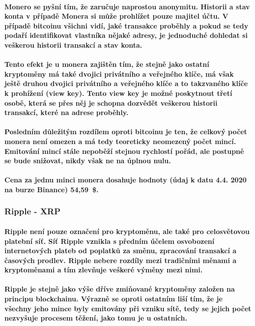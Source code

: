 \documentclass[thesis=B,czech]{FITthesis}[2019/03/21]
\begin{document}
\paragraph{
Monero se pyšní tím, že zaručuje naprostou anonymitu. Historii a stav konta v případě Monera si může prohlížet pouze majitel účtu. V případě bitcoinu všichni vidí, jaké transakce proběhly a pokud se tedy podaří identifikovat vlastníka nějaké adresy, je jednoduché dohledat si veškerou historii transakcí a stav konta.
}
\paragraph{
Tento efekt je u monera zajištěn tím, že stejně jako ostatní kryptoměny má také dvojici privátního a veřejného klíče, má však ještě druhou dvojici privátního a veřejného klíče a to takzvaného klíče k prohížení (view key). Tento view key je možné poskytnout třetí osobě, která se přes něj je schopna dozvědět veškerou historii transakcí, které na adrese proběhly.
}
\paragraph{
Posledním důležitým rozdílem oproti bitcoinu je ten, že celkový počet monera není omezen a má tedy teoreticky neomezený počet mincí. Emitování mincí stále nepoběží stejnou rychlostí pořád, ale postupně se bude snižovat, nikdy však ne na úplnou nulu. \cite{alza_monero}
}
\paragraph{
Cena za jednu minci monera dosahuje hodnoty (údaj k datu 4.4. 2020 na burze Binance) 54,59~\$. \cite{binance_markets}
}
\subsubsection{Ripple - XRP}
\paragraph{
Ripple není pouze označení pro kryptoměnu, ale také pro celosvětovou platební síť. Síť Ripple vznikla s předním účelem osvobození internetových plateb od poplatků za směnu, zpracování transakcí a časových prodlev. Ripple nebere rozdíly mezi tradičními měnami a kryptoměnami a tím zlevňuje veškeré výměny mezi nimi.
}
\paragraph{
Ripple je stejně jako výše dříve zmiňované kryptoměny založen na principu blockchainu. Výrazně se oproti ostatním liší tím, že je všechny jeho mince byly emitovány při vzniku sítě, tedy se jejich počet nezvyšuje procesem těžení, jako tomu je u ostatních.
}
\end{document}
